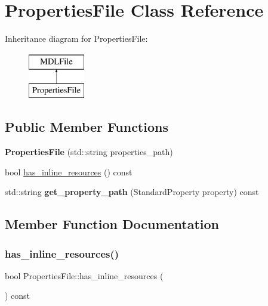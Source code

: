 \hypertarget{class_properties_file}{}\section{Properties\+File Class Reference}
\label{class_properties_file}
Inheritance diagram for Properties\+File\+:\begin{figure}[H]
\begin{center}
\leavevmode
\includegraphics[height=2.000000cm]{class_properties_file}
\end{center}
\end{figure}
\subsection*{Public Member Functions}
\begin{DoxyCompactItemize}
\item 
\mbox{\label{class_properties_file_a4e390d378d937c0414402f1b48a9fd39}} 
{\bfseries Properties\+File} (std\+::string properties\+\_\+path)
\item 
bool \mbox{\hyperlink{class_properties_file_a9d0632fbdef9f881c065b49d0b4bc7e9}{has\+\_\+inline\+\_\+resources}} () const
\item 
\mbox{\label{class_properties_file_aab2a9a8eeaa90367ac6e43d025f684d4}} 
std\+::string {\bfseries get\+\_\+property\+\_\+path} (Standard\+Property property) const
\end{DoxyCompactItemize}


\subsection{Member Function Documentation}
\mbox{\label{class_properties_file_a9d0632fbdef9f881c065b49d0b4bc7e9}} 
\subsubsection{\texorpdfstring{has\+\_\+inline\+\_\+resources()}{has\_inline\_resources()}}
{\footnotesize\ttfamily bool Properties\+File\+::has\+\_\+inline\+\_\+resources (\begin{DoxyParamCaption}{ }\end{DoxyParamCaption}) const}


